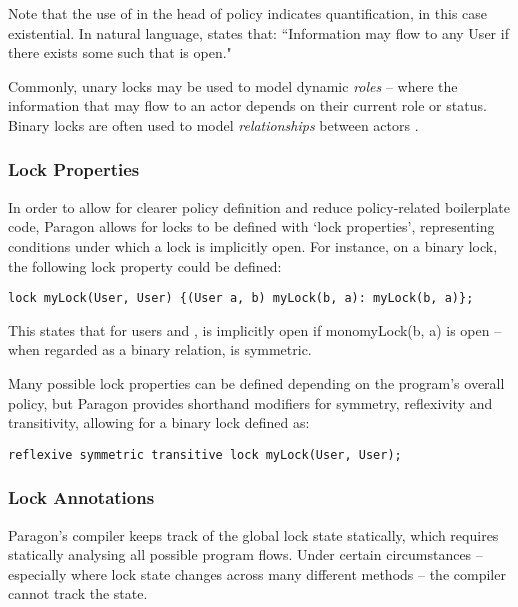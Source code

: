 Note that the use of  in the head of policy  indicates quantification, in this case existential. In natural language,  states that: ``Information may flow to any User  if there exists some  such that  is open."

Commonly, unary locks may be used to model dynamic \textit{roles} -- where the information that may flow to an actor depends on their current role or status. Binary locks are often used to model \textit{relationships} between actors \cite{broberg2013paragon}.

\subsubsection{Lock Properties}

In order to allow for clearer policy definition and reduce policy-related boilerplate code, Paragon allows for locks to be defined with `lock properties', representing conditions under which a lock is implicitly open. For instance, on a binary lock, the following lock property could be defined:

\begin{verbatim}
lock myLock(User, User) {(User a, b) myLock(b, a): myLock(b, a)};
\end{verbatim}

This states that for users  and ,  is implicitly open if mono{myLock(b, a)} is open -- when regarded as a binary relation,  is symmetric.

Many possible lock properties can be defined depending on the program's overall policy, but Paragon provides shorthand modifiers for symmetry, reflexivity and transitivity, allowing for a binary lock defined as:

\begin{verbatim}
reflexive symmetric transitive lock myLock(User, User);
\end{verbatim}

\subsubsection{Lock Annotations}

Paragon's compiler keeps track of the global lock state statically, which requires statically analysing all possible program flows. Under certain circumstances -- especially where lock state changes across many different methods -- the compiler cannot track the state.

